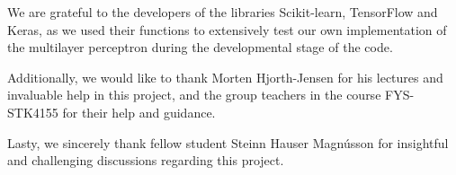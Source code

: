 \documentclass[a4paper, 11pt, twocolumn]{article}
\begin{document}
We are grateful to the developers of the libraries Scikit-learn, TensorFlow and 
Keras, as we used their functions to extensively test our own implementation of 
the multilayer perceptron during the developmental 
stage of the code. 

Additionally, we would like to thank Morten Hjorth-Jensen for his lectures and 
invaluable help in this project, and the group teachers in the course FYS-STK4155 
for their help and guidance. 

Lasty, we sincerely thank fellow student Steinn Hauser Magnússon for insightful 
and challenging discussions regarding this project. 

%

\end{document}

